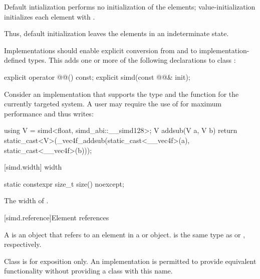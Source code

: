 \begin{wgText}
\pnum
Default intialization performs no initialization of the elements; value-initialization initializes each element with . \begin{note}Thus, default initialization leaves the elements in an indeterminate state.\end{note}

\pnum
Implementations should enable explicit conversion from and to implementation-defined types. This adds one or more of the following declarations to class :

\begin{codeblock}
explicit operator @@() const;
explicit simd(const @@& init);
\end{codeblock}

\begin{example}
  Consider an implementation that supports the type  and the function  for the currently targeted system.
  A user may require the use of  for maximum performance and thus writes:
  \begin{codeblock}
    using V = simd<float, simd_abi::__simd128>;
    V addsub(V a, V b) {
      return static_cast<V>(_vec4f_addsub(static_cast<__vec4f>(a), static_cast<__vec4f>(b)));
    }
  \end{codeblock}
\end{example}

[simd.width]{ width}

\begin{itemdecl}
static constexpr size_t size() noexcept;
\end{itemdecl}

\begin{itemdescr}
  \pnum\returns
  The width of .
\end{itemdescr}

[simd.reference]{Element references}

\pnum
A  is an object that refers to an element in a  or  object.  is the same type as  or , respectively.

\pnum
Class  is for exposition only. An implementation is permitted to provide equivalent functionality without providing a class with this name.


\end{wgText}

